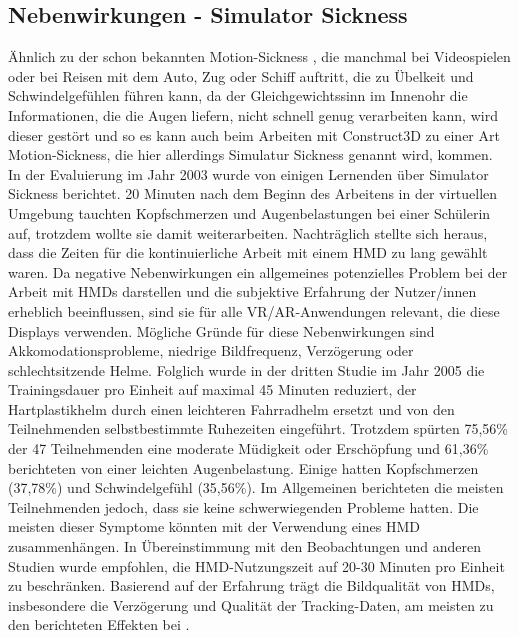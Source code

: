 \documentclass[deutsch]{llncs}
\begin{document}
\subsection{Nebenwirkungen - Simulator Sickness}
Ähnlich zu der schon bekannten Motion-Sickness \cite{motionsickness}, die manchmal bei Videospielen oder bei Reisen mit dem Auto, Zug oder Schiff auftritt, die zu Übelkeit und Schwindelgefühlen führen kann, da der Gleichgewichtssinn im Innenohr die Informationen, die die Augen liefern, nicht schnell genug verarbeiten kann, wird dieser gestört und so es kann auch beim Arbeiten mit Construct3D zu einer Art Motion-Sickness, die hier allerdings
Simulatur Sickness genannt wird, kommen.
 \\
In der Evaluierung im Jahr 2003 wurde von einigen Lernenden über Simulator Sickness berichtet. 20 Minuten nach dem Beginn des Arbeitens in der virtuellen Umgebung tauchten Kopfschmerzen und Augenbelastungen bei einer Schülerin auf, trotzdem wollte sie damit weiterarbeiten. Nachträglich stellte sich heraus, dass die Zeiten für die kontinuierliche Arbeit mit einem HMD zu lang gewählt waren. Da negative Nebenwirkungen ein allgemeines potenzielles Problem bei der Arbeit mit HMDs darstellen und die subjektive Erfahrung der Nutzer/innen erheblich beeinflussen, sind sie für alle VR/AR-Anwendungen relevant, die diese Displays verwenden. Mögliche Gründe für diese Nebenwirkungen sind Akkomodationsprobleme, niedrige Bildfrequenz, Verzögerung oder schlechtsitzende Helme. 
Folglich wurde in der dritten Studie im Jahr 2005 die Trainingsdauer pro Einheit auf maximal 45 Minuten reduziert, der Hartplastikhelm durch einen leichteren Fahrradhelm ersetzt und von den Teilnehmenden selbstbestimmte Ruhezeiten eingeführt. Trotzdem spürten 75,56\% der 47 Teilnehmenden eine moderate Müdigkeit oder Erschöpfung und 61,36\% berichteten von einer leichten Augenbelastung. Einige hatten Kopfschmerzen (37,78\%) und Schwindelgefühl (35,56\%). Im Allgemeinen berichteten die meisten Teilnehmenden jedoch, dass sie keine schwerwiegenden Probleme hatten. Die meisten dieser Symptome könnten mit der Verwendung eines HMD zusammenhängen. In Übereinstimmung mit den Beobachtungen und anderen Studien wurde empfohlen, die HMD-Nutzungszeit auf 20-30 Minuten pro Einheit zu beschränken.  Basierend auf der Erfahrung trägt die Bildqualität von HMDs, insbesondere die Verzögerung und Qualität der Tracking-Daten, am meisten zu den berichteten Effekten bei \cite{Kaufmann_summaryof}.
\end{document}
